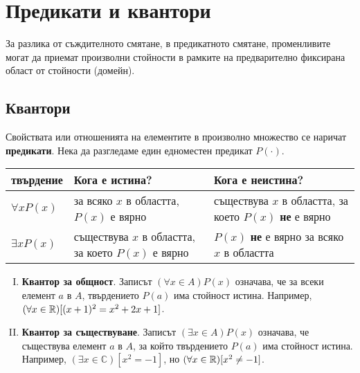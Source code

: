 \section{Предикати и квантори}

За разлика от съждителното смятане, в предикатното смятане, променливите могат да приемат 
произволни стойности в рамките на предварително фиксирана област от стойности (домейн).

\subsection*{Квантори}

Свойствата или отношенията на елементите в произволно множество се наричат {\bf предикати}.
Нека да разгледаме един едноместен предикат $P(\cdot)$.

\bigskip
\begin{tabular}{|l|p{4.2cm}|p{4.5cm}|}
  \hline
  твърдение & Кога е истина? & Кога е неистина?\\
  \hline
  $\forall x P(x)$ & за всяко $x$ в областта, $P(x)$ е вярно & съществува $x$ в областта, за което $P(x)$ {\bf не} е вярно \\
  \hline
  $\exists x P(x)$ & съществува $x$ в областта, за което $P(x)$ е вярно & $P(x)$ {\bf не} е вярно за всяко $x$ в областта\\
  \hline
\end{tabular}  
\bigskip

\begin{enumerate}[(I)]
\item 
  {\bf Квантор за общност}.
  Записът $(\forall x \in A) P(x)$ означава, че за всеки елемент $a$ в $A$, 
  твърдението $P(a)$ има стойност истина.
  Например, $(\forall x\in\mathbb{R})[(x+1)^2 = x^2+2x+1]$.
\item
  {\bf Квантор за съществуване}.
  Записът $(\exists x \in A) P(x)$ означава, че съществува елемент $a$ в $A$, 
  за който твърдението $P(a)$ има стойност истина.
  Например, $(\exists x \in\mathbb{C})[x^2 = -1]$, но $(\forall x\in\mathbb{R})[x^2 \neq -1]$.
\end{enumerate}

